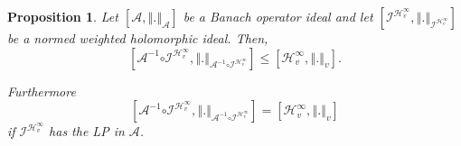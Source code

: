 \documentclass[12pt]{amsart}
\theoremstyle{plain}
\newtheorem{proposition}[theorem]{Proposition}
\numberwithin{equation}{section}
\begin{document}
\begin{proposition}\label{coincidence}
\label{3}Let $\left[ \mathcal{A},\left\Vert .\right\Vert _{\mathcal{A}}%
\right] $ be a Banach operator ideal and let $\left[ \mathcal{I}^{\mathcal{H}%
_{v}^{\infty }},\left\Vert .\right\Vert _{\mathcal{I}^{\mathcal{H}%
_{v}^{\infty }}}\right] $ be a normed weighted holomorphic ideal. Then,%
\begin{equation*}
\left[ \mathcal{A}^{-1}\mathcal{\circ I}^{\mathcal{H}_{v}^{\infty
}},\left\Vert .\right\Vert _{\mathcal{A}^{-1}\mathcal{\circ I}^{\mathcal{H}%
_{v}^{\infty }}}\right] \leq \left[ \mathcal{H}_{v}^{\infty },\left\Vert
.\right\Vert _{v}\right] .
\end{equation*}

Furthermore%
\begin{equation*}
\left[ \mathcal{A}^{-1}\mathcal{\circ I}^{\mathcal{H}_{v}^{\infty
}},\left\Vert .\right\Vert _{\mathcal{A}^{-1}\mathcal{\circ I}^{\mathcal{H}%
_{v}^{\infty }}}\right] =\left[ \mathcal{H}_{v}^{\infty },\left\Vert
.\right\Vert _{v}\right]
\end{equation*}%
if $\mathcal{I}^{\mathcal{H}_{v}^{\infty }}$ has the LP in $\mathcal{A}$.
\end{proposition}
\end{document}
